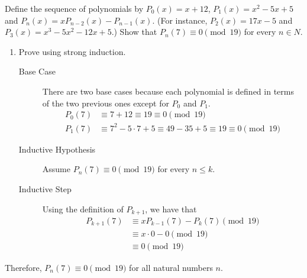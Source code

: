 \question Define the sequence of polynomials by $P_0(x) = x + 12$, 
$P_1(x) = x^2 - 5x + 5$ and $P_n(x) = xP_{n-2}(x) - P_{n-1}(x)$. 
(For instance, $P_2(x) = 17x-5$ and $P_3(x) = x^3 -5x^2 -12x+5$.) 
Show that $P_n(7) \equiv 0 \pmod{19}$ for every $n \in N$. 
\begin{solution}[1in]

\begin{enumerate}
\item Prove using strong induction.
\begin{description}
\item[Base Case] There are two base cases because each polynomial is 
defined in terms of the two previous ones except for $P_0$ and $P_1$.
\begin{equation}
\begin{split}
P_0(7) &\equiv 7 + 12 \equiv 19 \equiv 0 \pmod{19} \\ \nonumber
P_1(7) &\equiv 7^2 - 5\cdot 7 + 5 \equiv 49 - 35 + 5 \equiv 19 \equiv 
0 \pmod{19}
\end{split}
\end{equation}
\item[Inductive Hypothesis] Assume $P_n(7) \equiv 0 \pmod{19}$ for 
every $n \leq k$.
\item [Inductive Step] Using the definition of $P_{k+1}$, we have that 
\begin{equation}
\begin{split}
P_{k+1}(7) &\equiv xP_{k-1}(7) - P_k(7) \pmod{19} \\ \nonumber
&\equiv x \cdot 0 - 0 \pmod{19} \\
&\equiv 0 \pmod{19}
\end{split}
\end{equation}
\end{description}
\end{enumerate}
Therefore, $P_n(7) \equiv 0 \pmod{19}$ for all natural numbers $n$.
\end{solution}

